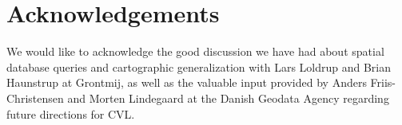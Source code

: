\section{Acknowledgements}
We would like to acknowledge the good discussion we have had about spatial database queries and cartographic generalization with Lars Loldrup and Brian Haunstrup at Grontmij, as well as the valuable input provided by Anders Friis-Christensen and Morten Lindegaard at the Danish Geodata Agency regarding future directions for CVL.